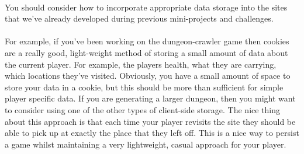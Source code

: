\documentclass[10pt, a4paper, twosize]{article}
\begin{document}
\paragraph{} You should consider how to incorporate appropriate data storage into the sites that we've already developed during previous mini-projects and challenges. 

\paragraph{} For example, if you've been working on the dungeon-crawler game then cookies are a really good, light-weight method of storing a small amount of data about the current player. For example, the players health, what they are carrying, which locations they've visited. Obviously, you have a small amount of space to store your data in a cookie, but this should be more than sufficient for simple player specific data. If you are generating a larger dungeon, then you might want to consider using one of the other types of client-side storage. The nice thing about this approach is that each time your player revisits the site they should be able to pick up at exactly the place that they left off. This is a nice way to persist a game whilst maintaining a very lightweight, casual approach for your player.
\end{document}
